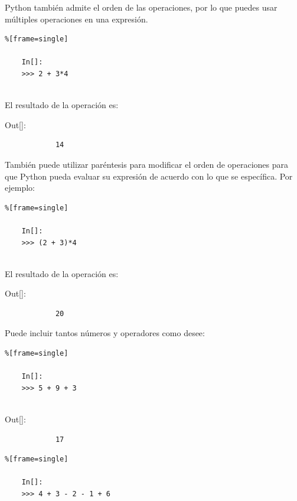 Python también admite el orden de las operaciones, por lo que puedes usar múltiples
operaciones en una expresión. 
\begin{lstlisting}%[frame=single]
	
	In[]:
	>>> 2 + 3*4	
	
\end{lstlisting}

El resultado de la operación es:\\

{\ttfamily\scriptsize\scriptsize 
	\hspace{-0.65cm}Out[]:\vspace{-0.15cm}	
	{\color{blue} 	
		\begin{verbatim}
			14
		\end{verbatim}
}}

También puede utilizar paréntesis para modificar el orden de operaciones para que Python
pueda evaluar su expresión de acuerdo con lo que se específica. Por ejemplo:

\begin{lstlisting}%[frame=single]
	
	In[]:	
	>>> (2 + 3)*4	
	
\end{lstlisting}

El resultado de la operación es:\\

{\ttfamily\scriptsize\scriptsize 
	\hspace{-0.65cm}Out[]:\vspace{-0.15cm}	
	{\color{blue} 	
		\begin{verbatim}
			20
		\end{verbatim}
}}


Puede incluir tantos números y operadores como desee:

\begin{lstlisting}%[frame=single]
	
	In[]:	
	>>> 5 + 9 + 3
	
\end{lstlisting}

{\ttfamily\scriptsize\scriptsize 
	\hspace{-0.65cm}Out[]:\vspace{-0.15cm}	
	{\color{blue} 	
		\begin{verbatim}
			17
		\end{verbatim}
}}



\begin{lstlisting}%[frame=single]
	
	In[]:	
	>>> 4 + 3 - 2 - 1 + 6	
	
\end{lstlisting}

